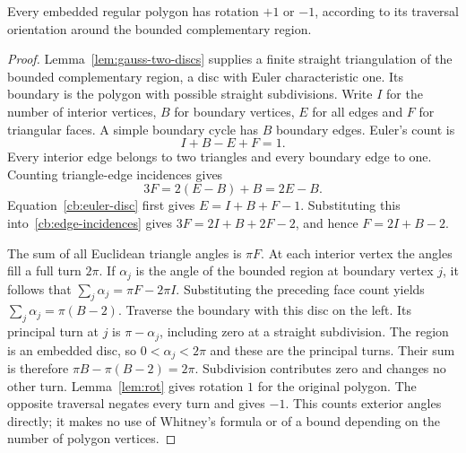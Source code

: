 \begin{lemma}
\label{cb:embedded-rotation}
Every embedded regular polygon has rotation $+1$ or $-1$, according
to its traversal orientation around the bounded complementary region.
\end{lemma}
\begin{proof}
Lemma~\ref{lem:gauss-two-discs} supplies a finite straight triangulation
of the bounded complementary region, a disc with Euler characteristic
one. Its boundary is the polygon with possible straight subdivisions.
Write $I$ for the number of interior vertices, $B$ for boundary vertices,
$E$ for all edges and $F$ for triangular faces. A simple boundary cycle
has $B$ boundary edges. Euler's count is
\begin{equation}\label{cb:euler-disc}
 I+B-E+F=1.
\end{equation}
Every interior edge belongs to two triangles and every boundary edge
to one. Counting triangle-edge incidences gives
\begin{equation}\label{cb:edge-incidences}
 3F=2(E-B)+B=2E-B.
\end{equation}
Equation~\eqref{cb:euler-disc} first gives $E=I+B+F-1$.
Substituting this into~\eqref{cb:edge-incidences} gives
$3F=2I+B+2F-2$, and hence $F=2I+B-2$.

The sum of all Euclidean triangle angles is $\pi F$. At each
interior vertex the angles fill a full turn $2\pi$. If $\alpha_j$
is the angle of the bounded region at boundary vertex $j$, it follows
that $\sum_j\alpha_j=\pi F-2\pi I$. Substituting the preceding face
count yields $\sum_j\alpha_j=\pi(B-2)$.
Traverse the boundary with this disc on the left. Its principal turn
at $j$ is $\pi-\alpha_j$, including zero at a straight subdivision.
The region is an embedded disc, so $0<\alpha_j<2\pi$ and these are
the principal turns. Their sum is therefore
$\pi B-\pi(B-2)=2\pi$. Subdivision contributes zero and changes no
other turn. Lemma~\ref{lem:rot} gives rotation $1$ for the original
polygon. The opposite traversal negates every turn and gives $-1$.
This counts exterior angles directly; it makes no use of Whitney's
formula or of a bound depending on the number of polygon vertices.
\end{proof}


